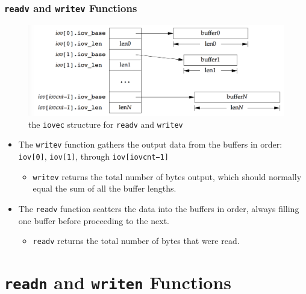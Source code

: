 \documentclass[newPxFont,sthlmFooter,nooffset]{beamer}
\begin{document}
\begin{frame}[t]
  \frametitle{\texttt{readv} and \texttt{writev} Functions}
\begin{figure}[h]
  \includegraphics[width=0.8\linewidth]{figures/fig14_22-iovec.png}
  \caption{the \texttt{iovec} structure for \texttt{readv} and \texttt{writev}}
\end{figure}

{\footnotesize
\begin{itemize}
\item The \texttt{writev} function gathers the output data from the buffers in order: \texttt{iov[0]}, \texttt{iov[1]}, through \texttt{iov[iovcnt−1]}
  \begin{itemize}
  \item \texttt{writev} returns the total number of bytes output,
    which should normally equal the sum of all the buffer lengths.
  \end{itemize}
\item The \texttt{readv} function scatters the data into the buffers in order, always filling one buffer before proceeding to the next.
  \begin{itemize}
  \item \texttt{readv} returns the total number of bytes that were
    read.
  \end{itemize}

\end{itemize}
}
\end{frame}



\section{\texttt{readn} and \texttt{writen} Functions}
\end{document}
